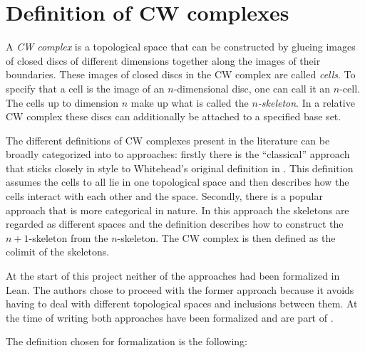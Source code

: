 \section{Definition of CW complexes}


A \emph{CW complex} is a topological space that can be constructed by glueing images of closed discs of different dimensions together along the images of their boundaries. 
These images of closed discs in the CW complex are called \emph{cells}.
To specify that a cell is the image of an $n$-dimensional disc, one can call it an $n$-cell.
The cells up to dimension $n$ make up what is called the \emph{$n$-skeleton}.
In a relative CW complex these discs can additionally be attached to a specified base set. 

The different definitions of CW complexes present in the literature can be broadly categorized into to approaches: firstly there is the ``classical'' approach that sticks closely in style to Whitehead's original definition in \cite{Whitehead2018}.
This definition assumes the cells to all lie in one topological space and then describes how the cells interact with each other and the space.
Secondly, there is a popular approach that is more categorical in nature. 
In this approach the skeletons are regarded as different spaces and the definition describes how to construct the $n+1$-skeleton from the $n$-skeleton. 
The CW complex is then defined as the colimit of the skeletons. 

At the start of this project neither of the approaches had been formalized in Lean. 
The authors chose to proceed with the former approach because it avoids having to deal with different topological spaces and inclusions between them. 
At the time of writing both approaches have been formalized and are part of \mathlib.

The definition chosen for formalization is the following: 

